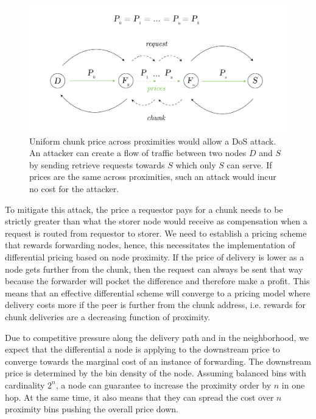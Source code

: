 \begin{figure}[htbp]
   \centering
   \includegraphics[width=\textwidth]{fig/ddos-uniform-price.pdf}
   \caption[Uniform chunk price across proximities would allow a DoS \statusgreen]{Uniform chunk price across proximities would allow a DoS attack. An attacker can create a flow of traffic between two nodes $D$ and $S$ by sending retrieve requests towards $S$ which only $S$ can serve. If prices are the same across proximities, such an attack would incur no cost for the attacker.}
   \label{fig:ddos-uniform-price}
\end{figure}

To mitigate this attack, the price a requestor pays for a chunk needs to be strictly greater than what the storer node would receive as compensation when a request is routed from requestor to storer. We need to establish a pricing scheme that rewards forwarding nodes, hence, this necessitates the implementation of differential pricing based on node proximity. If the price of delivery is lower as a node gets further from the chunk, then the request can always be sent that way because the forwarder will pocket the difference and therefore make a profit. This means that an effective differential scheme will converge to a pricing model where delivery costs more if the peer is further from the chunk address, i.e. rewards for chunk deliveries are a decreasing function of proximity. 

Due to competitive pressure along the delivery path and in the neighborhood, we expect that the differential a node is applying to the downstream price to converge towards the marginal cost of an instance of forwarding.
The downstream price is determined by the bin density of the node. Assuming balanced bins with cardinality $2^n$, a node can guarantee to increase the proximity order by $n$ in one hop. At the same time, it also means that they can spread the cost over $n$ proximity bins pushing the overall price down.


